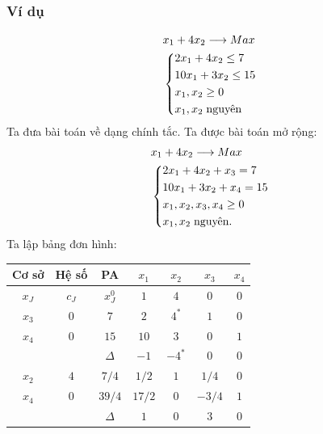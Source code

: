 \documentclass[12pt,a4paper]{report}
\begin{document}
    \subsubsection{Ví dụ}
    \begin{equation*}
        \begin{split}
         &x_1+4x_2 \longrightarrow Max \\
        & \left\{\begin{split}
            & 2x_1+4x_2 \le 7\\
            & 10x_1+3x_2\le 15\\
            & x_1,x_2 \ge 0\\
            & x_1,x_2 \hspace{0.1cm} \text{nguyên}\\
        \end{split}\right.
    \end{split}
    \end{equation*}
    Ta đưa bài toán về dạng chính tắc. Ta được bài toán mở rộng:\\
    \begin{equation*}
        \begin{split}
         &x_1+4x_2 \longrightarrow Max \\
        & \left\{\begin{split}
            & 2x_1+4x_2+x_3= 7\\
            & 10x_1+3x_2+   x_4= 15\\
            & x_1,x_2,x_3,x_4 \ge 0\\
            & x_1,x_2 \hspace{0.1cm}\text{nguyên}.\\
        \end{split}\right.
    \end{split}
    \end{equation*}
    Ta lập bảng đơn hình:\\
    \begin{center}
        \begin{tabular}{|c|c|c|c|c|c|c|}
    \hline
     Cơ sở & Hệ số & PA& $x_1$ &$x_2$ &$ x_3$ &$x_4$ \\
     \hline
        $x_J$ &$c_J$ &$x_J^0$ &$1$ &$4$ &$0$ &$0$\\
        \hline
        $x_3$ &$0$ &$7$ &$2$ &$4^*$ &$1$ &$0$\\
        $x_4$ &$0$ &$15$ &$10$ &$3$ &$0$ &$1$\\
        \hline
        && $\Delta$ &$-1$ &$-4^*$ &$0$ &$0$\\
        \hline
        $x_2$ &$4$ &$7/4$ &$1/2$ &$1$ &$1/4$ &$0$\\
        $x_4$ &$0$ &$39/4$ &$17/2$ &$0$ &$-3/4$ &$1$\\
        \hline
        && $\Delta$ &$1$ & $0$ &$3$ &$0$\\
        \hline
    \end{tabular}
    \end{center}
\end{document}
